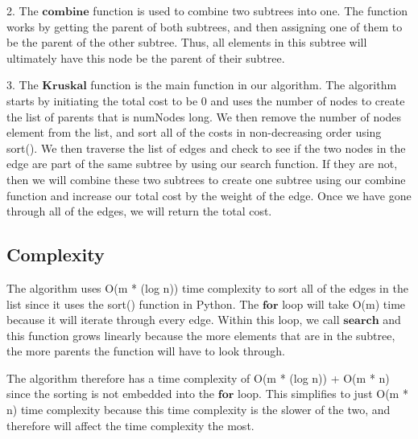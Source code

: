 2. The $\textbf{combine}$ function is used to combine two subtrees into one. The function works by getting the parent of both subtrees, and then assigning one of them to be the parent of the other subtree. Thus, all elements in this subtree will ultimately have this node be the parent of their subtree. 

3. The $\textbf{Kruskal}$ function is the main function in our algorithm. The algorithm starts by initiating the total cost to be 0 and uses the number of nodes to create the list of parents that is numNodes long. We then remove the number of nodes element from the list, and sort all of the costs in non-decreasing order using sort(). We then traverse the list of edges and check to see if the two nodes in the edge are part of the same subtree by using our search function. If they are not, then we will combine these two subtrees to create one subtree using our combine function and increase our total cost by the weight of the edge. Once we have gone through all of the edges, we will return the total cost.  

\subsection{Complexity}
The algorithm uses O(m * (log n)) time complexity to sort all of the edges in the list since it uses the sort() function in Python. The $\textbf{for}$ loop will take O(m) time because it will iterate through every edge. Within this loop, we call $\textbf{search}$ and this function grows linearly because the more elements that are in the subtree, the more parents the function will have to look through. 

The algorithm therefore has a time complexity of O(m * (log n)) + O(m * n) since the sorting is not embedded into the $\textbf{for}$ loop. This simplifies to just O(m * n) time complexity because this time complexity is the slower of the two, and therefore will affect the time complexity the most.

\pagebreak